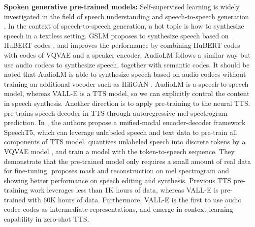 \documentclass{article}
\theoremstyle{plain}
\theoremstyle{definition}
\theoremstyle{remark}
\newcommand\our{\textsc{VALL-E}}
\begin{document}
\textbf{Spoken generative pre-trained models:} Self-supervised learning is widely investigated in the field of speech understanding \citep{baevski2020wav2vec,hsu2021hubert,chen2022wavlm} and speech-to-speech generation \citep{DBLP:journals/corr/abs-2102-01192, DBLP:journals/corr/abs-2209-03143}. In the context of speech-to-speech generation, a hot topic is how to synthesize speech in a textless setting. GSLM \citep{DBLP:journals/corr/abs-2102-01192} proposes to synthesize speech based on  HuBERT codes \citep{hsu2021hubert}, and \cite{DBLP:conf/interspeech/PolyakACKLHMD21} improves the performance by combining HuBERT codes with codes of VQVAE and a speaker encoder. 
AudioLM \citep{DBLP:journals/corr/abs-2209-03143} follows a similar way but use audio codecs \citep{DBLP:journals/taslp/ZeghidourLOST22} to synthesize speech, together with semantic codes. It should be noted that AudioLM is able to synthesize speech based on audio codecs without training an additional vocoder such as HifiGAN \citep{DBLP:conf/nips/KongKB20}. AudioLM is a speech-to-speech model, whereas \our{} is a TTS model, so we can explicitly control the content in speech synthesis.  
Another direction is to apply pre-training to the neural TTS. \cite{DBLP:conf/icassp/ChungWHZS19} pre-trains speech decoder in TTS through autoregressive mel-spectrogram prediction. 
In \cite{ao2022speecht5}, the authors propose a unified-modal encoder-decoder framework SpeechT5, which can leverage unlabeled speech and text data to pre-train all components of TTS model.
\cite{DBLP:conf/interspeech/TjandraS0S0019} quantizes unlabeled speech into discrete tokens by a VQVAE model \citep{van2017neural}, and train a model with the token-to-speech sequence. They demonstrate that the pre-trained model only requires a small amount of real data for fine-tuning. \cite{DBLP:conf/icml/BaiZCML022} proposes mask and reconstruction on mel spectrogram and showing better performance on speech editing and synthesis. Previous TTS pre-training work leverages less than 1K hours of data, whereas \our{} is pre-trained with 60K hours of data. Furthermore, \our{} is the first to use audio codec codes as  intermediate representations, and emerge in-context learning capability in zero-shot TTS.

\end{document}
